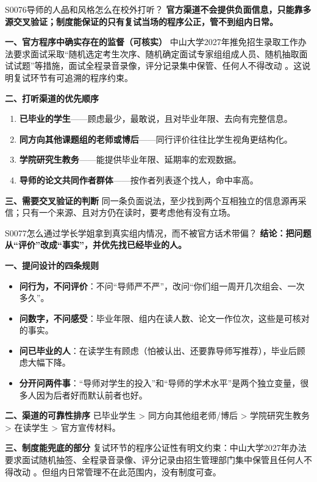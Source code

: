 \begin{qa}{S0076}{导师的人品和风格怎么在校外打听？}
\textbf{官方渠道不会提供负面信息，只能靠多源交叉验证；制度能保证的只有复试当场的程序公正，管不到组内日常。}

\textbf{一、官方程序中确实存在的监督（可核实）}
中山大学2027年推免招生录取工作办法要求面试采取“随机选定考生次序、随机确定面试专家组组成人员、随机抽取面试试题”等措施，面试全程录音录像，评分记录集中保管、任何人不得改动 。这说明复试环节有可追溯的程序约束。

\textbf{二、打听渠道的优先顺序}
\begin{enumerate}
  \item \textbf{已毕业的学生}——顾虑最少，最敢说，且对毕业年限、去向有完整信息。
  \item \textbf{同方向其他课题组的老师或博后}——同行评价往往比学生视角更结构化。
  \item \textbf{学院研究生教务}——能提供毕业年限、延期率的宏观数据。
  \item \textbf{导师的论文共同作者群体}——按作者列表逐个找人，命中率高。
\end{enumerate}

\textbf{三、需要交叉验证的判断}
同一条负面说法，至少找到两个互相独立的信息源再采信；只有一个来源、且对方仍在读时，要考虑他有没有立场。
\end{qa}

\begin{qa}{S0077}{怎么通过学长学姐拿到真实组内情况，而不被官方话术带偏？}
\textbf{结论：把问题从“评价”改成“事实”，并优先找已经毕业的人。}

\textbf{一、提问设计的四条规则}
\begin{itemize}
  \item \textbf{问行为，不问评价}：不问“导师严不严”，改问“你们组一周开几次组会、一次多久”。
  \item \textbf{问数字，不问感受}：毕业年限、组内在读人数、论文一作位次，这些是可核对的事实。
  \item \textbf{问已毕业的人}：在读学生有顾虑（怕被认出、还要靠导师写推荐），毕业后顾虑大幅下降。
  \item \textbf{分开问两件事}：“导师对学生的投入”和“导师的学术水平”是两个独立变量，很多人因为后者好而默认前者也好。
\end{itemize}

\textbf{二、渠道的可靠性排序}
已毕业学生 \textgreater{} 同方向其他组老师/博后 \textgreater{} 学院研究生教务 \textgreater{} 在读学生 \textgreater{} 官方宣传材料。

\textbf{三、制度能兜底的部分}
复试环节的程序公证性有明文约束：中山大学2027年办法要求面试随机抽签、全程录音录像、评分记录由招生管理部门集中保管且任何人不得改动 。但组内日常管理不在此范围内，没有制度可查。
\end{qa}

